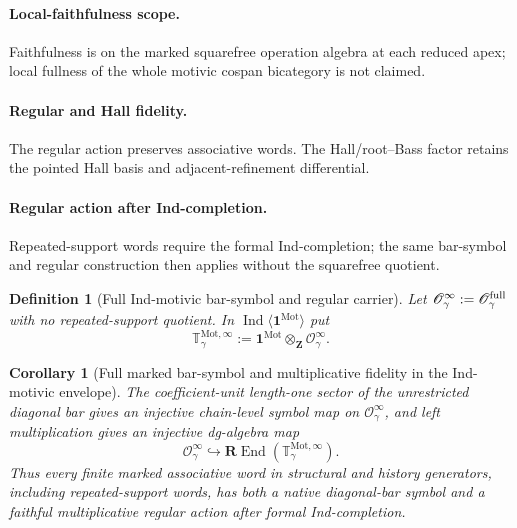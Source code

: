 \documentclass[11pt]{article}
\newtheorem{corollary}[theorem]{Corollary}
\newtheorem{definition}[theorem]{Definition}
\theoremstyle{remark}
\newcommand{\Z}{\mathbf Z}
\newcommand{\REnd}{\mathbf R\!\operatorname{End}}
\newcommand{\Mot}{\mathrm{Mot}}
\begin{document}
\paragraph{Local-faithfulness scope.}
Faithfulness is on the marked squarefree operation algebra at each reduced
apex; local fullness of the whole motivic cospan bicategory is not claimed.


\paragraph{Regular and Hall fidelity.}
The regular action preserves associative words.  The Hall/root--Bass factor
retains the pointed Hall basis and adjacent-refinement differential.


\paragraph{Regular action after Ind-completion.}

Repeated-support words require the formal Ind-completion; the same
bar-symbol and regular construction then applies without the squarefree
quotient.

\begin{definition}[Full Ind-motivic bar-symbol and regular carrier]
\label{P2M-def:v22-ind-regular-carrier}
Let $\mathscr O_{\gamma}^{\infty}:=\mathscr O_{\gamma}^{\rm full}$ with no
repeated-support quotient.  In
$\operatorname{Ind}\langle \mathbf 1^{\Mot}\rangle$ put
\begin{equation}
 \boxed{
 \mathbb T_{\gamma}^{\Mot,\infty}
 :=\mathbf 1^{\Mot}\otimes_{\Z}\mathscr O_{\gamma}^{\infty}.}
\end{equation}
\end{definition}

\begin{corollary}[Full marked bar-symbol and multiplicative fidelity in the Ind-motivic envelope]
\label{P2M-cor:v22-ind-full-word-faithfulness}
The coefficient-unit length-one sector of the unrestricted diagonal bar gives
an injective chain-level symbol map on
\(\mathscr O_\gamma^\infty\), and left multiplication gives an injective
dg-algebra map
\[
 \mathscr O_{\gamma}^{\infty}
 \hookrightarrow
 \REnd\!\left(\mathbb T_{\gamma}^{\Mot,\infty}\right).
\]
Thus every finite marked associative word in structural and history generators,
including repeated-support words, has both a native diagonal-bar symbol and a
faithful multiplicative regular action after formal Ind-completion.
\end{corollary}
\end{document}
